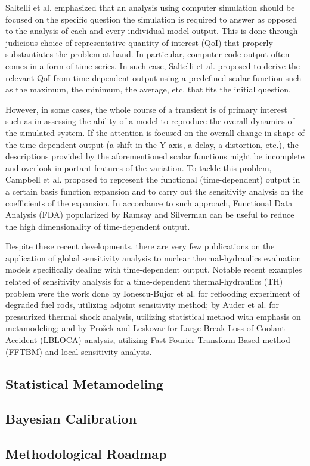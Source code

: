 Saltelli et al. \cite{Saltelli2006} emphasized that an analysis using computer simulation 
should be focused on the specific question the simulation is required to answer 
as opposed to the analysis of each and every individual model output. 
This is done through judicious choice of representative quantity of interest (QoI) 
that properly substantiates the problem at hand. 
In particular, computer code output often comes in a form of time series. 
In such case, Saltelli et al. \cite{Saltelli2008,Saltelli2004} proposed to derive the relevant QoI from time-dependent output 
using a predefined scalar function such as the maximum, the minimum, the average, etc. that fits the initial question.

However, in some cases, the whole course of a transient is of primary interest 
such as in assessing the ability of a model to reproduce the overall dynamics of the simulated system. 
If the attention is focused on the overall change in shape of the time-dependent output (a shift in the Y-axis, a delay, a distortion, etc.), 
the descriptions provided by the aforementioned scalar functions might be incomplete and overlook important features of the variation. 
To tackle this problem, Campbell et al. \cite{Campbell2006} proposed to represent the functional (time-dependent) output in a certain basis function expansion 
and to carry out the sensitivity analysis on the coefficients of the expansion. 
In accordance to such approach, Functional Data Analysis (FDA) popularized by Ramsay and Silverman \cite{Ramsay2005} can be useful to reduce the high dimensionality of time-dependent output.

Despite these recent developments, 
there are very few publications on the application of global sensitivity analysis to nuclear thermal-hydraulics evaluation models specifically dealing with time-dependent output.
Notable recent examples related of sensitivity analysis for a time-dependent thermal-hydraulics (TH) problem were the work done by Ionescu-Bujor et al. \cite{Ionescu-Bujor2005} 
for reflooding experiment of degraded fuel rods, utilizing adjoint sensitivity method; 
by Auder et al. \cite{Auder2012} for pressurized thermal shock analysis, 
utilizing statistical method with emphasis on metamodeling; 
and by Prošek and Leskovar \cite{Prosek2015} for Large Break Loss-of-Coolant-Accident (LBLOCA) analysis, 
utilizing Fast Fourier Transform-Based method (FFTBM) and local sensitivity analysis.

\subsection{Statistical Metamodeling}

\subsection{Bayesian Calibration}

\subsection{Methodological Roadmap}